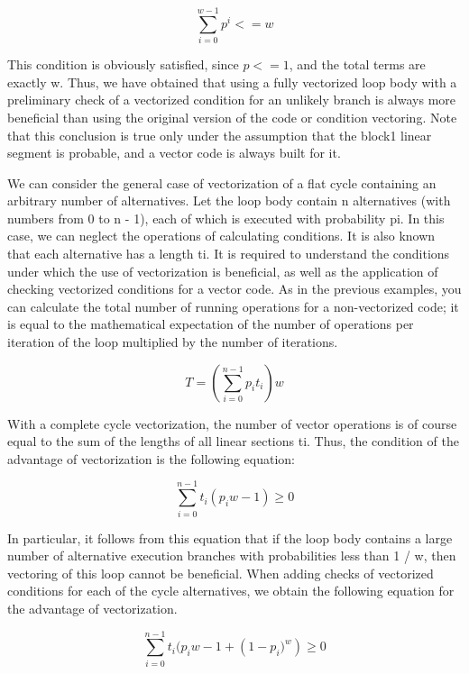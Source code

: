\documentclass[
11pt,%
tightenlines,%
twoside,%
onecolumn,%
nofloats,%
nobibnotes,%
nofootinbib,%
superscriptaddress,%
noshowpacs,%
centertags]%
{revtex4}
\begin{document}
\begin{equation}
\sum_{i = 0}^{w - 1}{p^i} <= w
\end{equation}

This condition is obviously satisfied, since $p <= 1$, and the total terms are exactly w. Thus, we have obtained that using a fully vectorized loop body with a preliminary check of a vectorized condition for an unlikely branch is always more beneficial than using the original version of the code or condition vectoring. Note that this conclusion is true only under the assumption that the block1 linear segment is probable, and a vector code is always built for it.

We can consider the general case of vectorization of a flat cycle containing an arbitrary number of alternatives. Let the loop body contain n alternatives (with numbers from 0 to n - 1), each of which is executed with probability pi. In this case, we can neglect the operations of calculating conditions. It is also known that each alternative has a length ti. It is required to understand the conditions under which the use of vectorization is beneficial, as well as the application of checking vectorized conditions for a vector code. As in the previous examples, you can calculate the total number of running operations for a non-vectorized code; it is equal to the mathematical expectation of the number of operations per iteration of the loop multiplied by the number of iterations.

\begin{equation}
T = \left( \sum_{i = 0}^{n - 1}{p_it_i} \right) w
\end{equation}

With a complete cycle vectorization, the number of vector operations is of course equal to the sum of the lengths of all linear sections ti. Thus, the condition of the advantage of vectorization is the following equation:

\begin{equation}
\sum_{i = 0}^{n - 1}{t_i(p_iw - 1)} \ge 0
\end{equation}

In particular, it follows from this equation that if the loop body contains a large number of alternative execution branches with probabilities less than 1 / w, then vectoring of this loop cannot be beneficial. When adding checks of vectorized conditions for each of the cycle alternatives, we obtain the following equation for the advantage of vectorization.

\begin{equation}
\sum_{i = 0}^{n - 1}{t_i \big( p_iw - 1 + (1 - p_i \big) ^w)} \ge 0
\end{equation}
\end{document}
